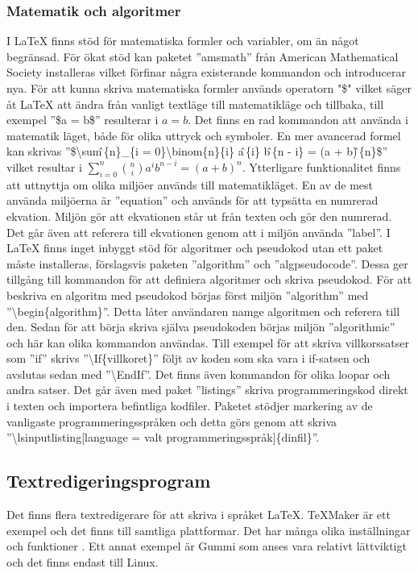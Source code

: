 \subsubsection{Matematik och algoritmer}
I {\LaTeX} finns stöd för matematiska formler och variabler, om än något begränsad. För ökat stöd kan paketet ''amsmath'' från American Mathematical Society installeras vilket förfinar några existerande kommandon och introducerar nya. För att kunna skriva matematiska formler används operatorn "\$" \hspace{0.2mm} vilket säger åt {\LaTeX} att ändra från vanligt textläge till matematikläge och tillbaka, till exempel ''\$a = b\$'' resulterar i $a = b$. Det finns en rad kommandon att använda i matematik läget, både för olika uttryck och symboler. En mer avancerad formel kan skrivas ''\$\textbackslash sum\^ \,\{n\}\_\{i = 0\}\textbackslash binom\{n\}\{i\} a\^ \,\{i\} b\^ \,\{n - i\} = (a + b)\^ \,\{n\}\$'' vilket resultar i $\sum^{n}_{i=0}\binom{n}{i}a^{i}b^{n-i} = (a + b)^{n}$. \citep{latexandfriends}
\newline
\newline
Ytterligare funktionalitet finns att uttnyttja om olika miljöer används till matematikläget. En av de mest använda miljöerna är ''equation'' och används för att typsätta en numrerad ekvation. Miljön gör att ekvationen står ut från texten och gör den numrerad. Det går även att referera till ekvationen genom att i miljön använda ''label''. \citep{latexandfriends}    
\newline
\newline
I {\LaTeX} finns inget inbyggt stöd för algoritmer och pseudokod utan ett paket måste installeras, förslagsvis paketen ''algorithm'' och ''algpseudocode''. Dessa ger tillgång till kommandon för att definiera algoritmer och skriva pseudokod. För att beskriva en algoritm med pseudokod börjas först miljön ''algorithm'' med ''\textbackslash begin\{algorithm\}''. Detta låter användaren namge algoritmen och referera till den. Sedan för att börja skriva själva pseudokoden börjas miljön ''algorithmic'' och här kan olika kommandon användas. Till exempel för att skriva villkorssatser som ''if'' skrivs ''\textbackslash If\{villkoret\}'' följt av koden som ska vara i if-satsen och avslutas sedan med ''\textbackslash EndIf''. Det finns även kommandon för olika loopar och andra satser. \citep{latexandfriends}
\newline
\newline
Det går även med paket ''listings'' skriva programmeringskod direkt i texten och importera befintliga kodfiler. Paketet stödjer markering av de vanligaste programmeringsspråken och detta görs genom att skriva ''\textbackslash lsinputlisting[language = valt programmeringsspråk]\{dinfil\}''. \citep{latexandfriends} 

\subsection{Textredigeringsprogram}
Det finns flera textredigerare för att skriva i språket {\LaTeX}. TeXMaker är ett exempel och det finns till samtliga plattformar. Det har många olika inställningar och funktioner \citep{texmaker}. Ett annat exempel är Gummi som anses vara relativt lättviktigt \citep{gummi} och det finns endast till Linux.   
